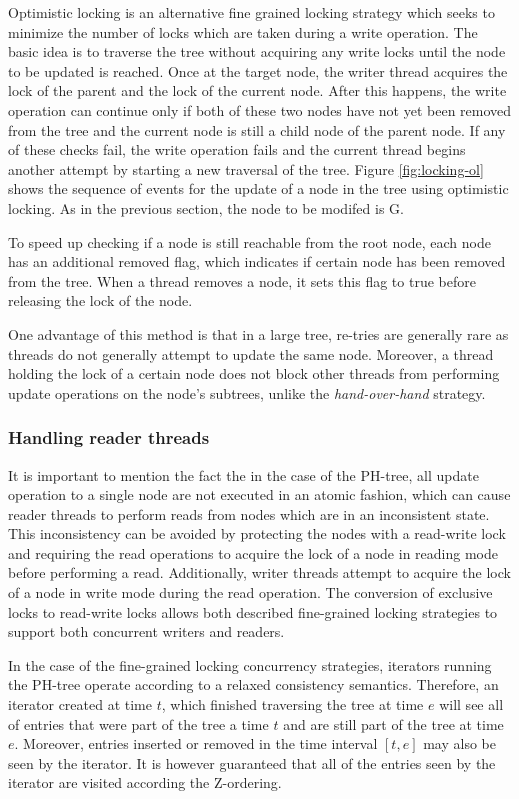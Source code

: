\documentclass[11pt,a4paper]{globis-book}
\begin{document}
Optimistic locking is an alternative fine grained locking strategy which seeks to minimize the number of locks which are taken during a write operation. The basic idea is to traverse the tree without acquiring any write locks until the node to be updated is reached. Once at the target node, the writer thread acquires the lock of the parent and the lock of the current node. After this happens, the write operation can continue only if both of these two nodes have not yet been removed from the tree and the current node is still a child node of the parent node. If any of these checks fail, the write operation fails and the current thread begins another attempt by starting a new traversal of the tree. Figure \ref{fig:locking-ol} shows the sequence of events for the update of a node in the tree using optimistic locking. As in the previous section, the node to be modifed is G. 

To speed up checking if a node is still reachable from the root node, each node has an additional removed flag, which indicates if certain node has been removed from the tree. When a thread removes a node, it sets this flag to true before releasing the lock of the node. 

One advantage of this method is that in a large tree, re-tries are generally rare as threads do not generally attempt to update the same node. Moreover, a thread holding the lock of a certain node does not block other threads from performing update operations on the node's subtrees, unlike the \textit{hand-over-hand} strategy.

\subsubsection{Handling reader threads}
It is important to mention the fact the in the case of the PH-tree, all update operation to a single node are not executed in an atomic fashion, which can cause reader threads to perform reads from nodes which are in an inconsistent state. This inconsistency can be avoided by protecting the nodes with a read-write lock and requiring the read operations to acquire the lock of a node in reading mode before performing a read. Additionally, writer threads attempt to acquire the lock of a node in write mode during the read operation. The conversion of exclusive locks to read-write locks allows both described fine-grained locking strategies to support both concurrent writers and readers. 

In the case of the fine-grained locking concurrency strategies, iterators running the PH-tree operate according to a relaxed consistency semantics. Therefore, an iterator created at time $t$, which finished traversing the tree at time $e$ will see all of entries that were part of the tree a time $t$ and are still part of the tree at time $e$. Moreover, entries inserted or removed in the time interval $[t, e]$ may also be seen by the iterator. It is however guaranteed that all of the entries seen by the iterator are visited according the Z-ordering. 
\end{document}
